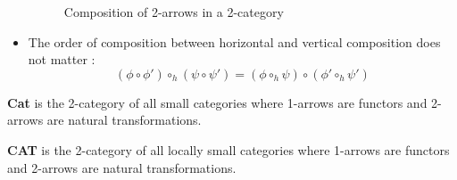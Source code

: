 \begin{defn}[2-category]
\begin{itemize}
\begin{figure}[h]
                  \caption{Composition of 2-arrows in a 2-category}
                  \label{fig:2-comp}
              \end{figure}
        \item The order of composition between horizontal and vertical composition does not matter : 
            $$(\phi\circ\phi')\circ_h(\psi\circ\psi') = (\phi\circ_h\psi)\circ(\phi'\circ_h\psi')$$
    \end{itemize}
\end{defn}




\begin{defn}[\bf Cat]
    \textbf{Cat}\label{nomencl:Cat} is the 2-category of all small categories where 1-arrows are functors and 2-arrows are natural transformations.
\end{defn}
\begin{defn}[\bf CAT]
    \textbf{CAT}\label{nomencl:CAT} is the 2-category of all locally small categories where 1-arrows are functors and 2-arrows are natural transformations.
\end{defn}

